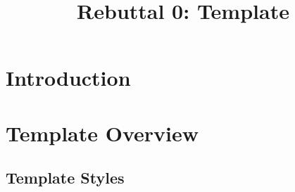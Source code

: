 \title{Rebuttal 0: Template}

\maketitle

\section{Introduction}

\section{Template Overview}

\subsection{Template Styles}
